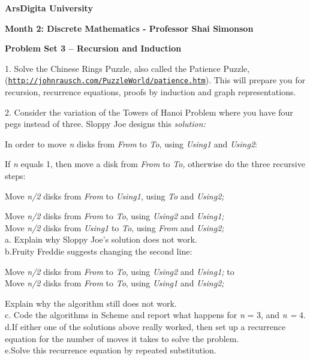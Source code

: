 \documentclass{article}
\def\R2Lurl#1#2{\mbox{\href{#1}{\tt #2}}}
\newcommand{\tab}{\makebox[4em]{}}
\begin{document}
\begin{center}
\textbf{ArsDigita University}


\end{center}

\begin{center}
\textbf{Month 2: Discrete Mathematics - Professor Shai Simonson}


\end{center}


\begin{center}
\textbf{Problem Set 3 -- Recursion and Induction}


\end{center}

1.\tab 
Solve the Chinese Rings Puzzle, also called the Patience Puzzle, 
(\R2Lurl{http://johnrausch.com/PuzzleWorld/patience.htm }{http://johnrausch.com/PuzzleWorld/patience.htm}). 
This will prepare you for recursion, recurrence equations, proofs 
by induction and graph representations.


2.\tab 
Consider the variation of the Towers of Hanoi Problem where you 
have four pegs instead of three. Sloppy Joe designs this \textit{solution:}



In order to move \textit{n} disks from \textit{From} to \textit{To}, using \textit{Using1} and 
\textit{Using2}: 


If \textit{n} equals 1, then move a disk from \textit{From} to \textit{To,} otherwise 
do the three recursive steps:


Move \textit{n/2} disks from \textit{From} to \textit{Using1}, using \textit{To} and \textit{Using2;}


Move \textit{n/2} disks from \textit{From} to \textit{To}, using \textit{Using2} and \textit{Using1;}\\
Move \textit{n/2} disks from \textit{Using1} to \textit{To}, using \textit{From} and \textit{Using2;}\\
a.\tab 
Explain why Sloppy Joe's solution does not work.\\
b.\tab Fruity Freddie suggests changing the second line: 


Move \textit{n/2} disks from \textit{From} to \textit{To}, using \textit{Using2} and \textit{Using1;} to\\
Move \textit{n/2} disks from \textit{From} to \textit{To}, using \textit{Using1} and \textit{Using2;}


Explain why the algorithm still does not work.\\
c.\tab 
Code the algorithms in Scheme and report what happens for \textit{n} = 
3, and \textit{n =} 4.\\
d.\tab If either one of the solutions above really worked, then set 
up a recurrence equation for the number of moves it takes to 
solve the problem.\\
e.\tab Solve this recurrence equation by repeated substitution.
\end{document}
